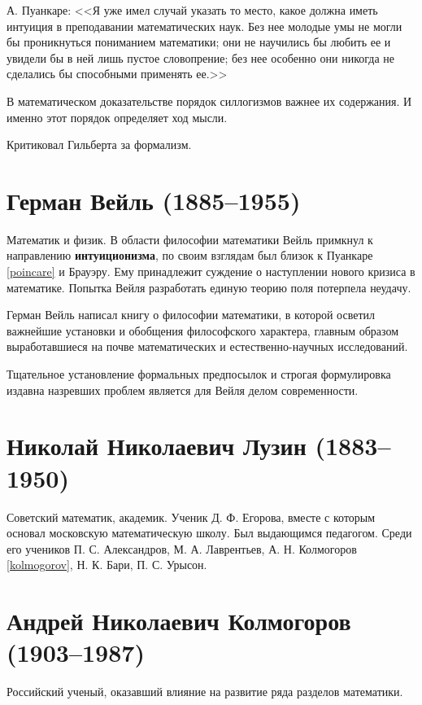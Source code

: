\documentclass[a4paper,14pt]{extreport}
\begin{document}
А. Пуанкаре: <<Я уже имел случай указать то место, какое должна иметь интуиция в преподавании математических наук. Без нее молодые умы не могли бы проникнуться пониманием математики; они не научились бы любить ее и увидели бы в ней лишь пустое словопрение; без нее особенно они никогда не сделались бы способными применять ее.>>\cite{onauke}

В математическом доказательстве порядок силлогизмов важнее их содержания. И именно этот порядок определяет ход мысли.

Критиковал Гильберта за формализм.


\label{weyl}
\section{Герман Вейль (1885--1955)}

Математик и физик.
В области философии математики Вейль примкнул к направлению \textbf{интуиционизма}, по своим взглядам был близок к Пуанкаре \ref{poincare} и Брауэру. Ему принадлежит суждение о наступлении нового кризиса в математике.
Попытка Вейля разработать единую теорию поля потерпела неудачу.
\cite{bogolubov}

Герман Вейль написал книгу о философии математики, в которой осветил важнейшие установки и обобщения философского характера, главным образом выработавшиеся на почве математических и естественно-научных исследований. 

Тщательное установление формальных предпосылок и строгая формулировка издавна назревших проблем является для Вейля делом современности.




\label{luzin}
\section{Николай Николаевич Лузин (1883--1950)}

Советский математик, академик. Ученик Д. Ф. Егорова, вместе с которым основал московскую математическую школу. 
Был выдающимся педагогом. Среди его учеников П. С. Александров, М. А. Лаврентьев, А. Н. Колмогоров \ref{kolmogorov}, Н. К. Бари, П. С. Урысон.



\label{kolmogorov}
\section{Андрей Николаевич Колмогоров (1903--1987)}
Российский ученый, оказавший влияние на развитие ряда разделов математики.
\end{document}
